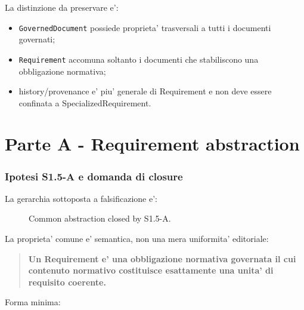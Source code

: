 \documentclass[11pt,a4paper]{article}
\begin{document}
La distinzione da preservare e':
\begin{itemize}
  \item \texttt{GovernedDocument} possiede proprieta' trasversali a tutti i documenti governati;
  \item \texttt{Requirement} accomuna soltanto i documenti che stabiliscono una obbligazione normativa;
  \item history/provenance e' piu' generale di Requirement e non deve essere confinata a SpecializedRequirement.
\end{itemize}

\newpage
\part*{Parte A - Requirement abstraction}

\section{Ipotesi S1.5-A e domanda di closure}

La gerarchia sottoposta a falsificazione e':

\begin{figure}[h]
\centering
{}
\caption{Common abstraction closed by S1.5-A.}
\end{figure}

La proprieta' comune e' semantica, non una mera uniformita' editoriale:

\begin{quote}
\textbf{Un Requirement e' una obbligazione normativa governata il cui contenuto normativo costituisce esattamente una unita' di requisito coerente.}
\end{quote}

Forma minima:
\end{document}
